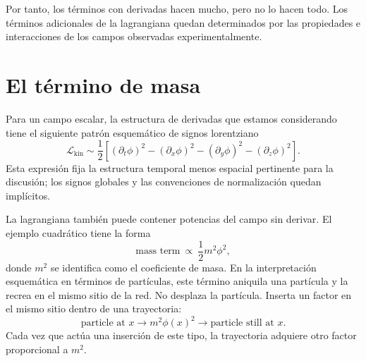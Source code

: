 \begin{classroomqa}\end{classroomqa}


Por tanto, los términos con derivadas hacen mucho, pero no lo hacen todo. Los términos adicionales de la lagrangiana quedan determinados por las propiedades e interacciones de los campos observadas experimentalmente.

\section{El término de masa}

Para un campo escalar, la estructura de derivadas que estamos considerando tiene el siguiente patrón esquemático de signos lorentziano
\begin{equation}
\mathcal{L}_{\mathrm{kin}}
\sim
\frac{1}{2}\left[
(\partial_t\phi)^2
-(\partial_x\phi)^2
-(\partial_y\phi)^2
-(\partial_z\phi)^2
\right].
\end{equation}
Esta expresión fija la estructura temporal menos espacial pertinente para la discusión; los signos globales y las convenciones de normalización quedan implícitos.

La lagrangiana también puede contener potencias del campo sin derivar. El ejemplo cuadrático tiene la forma
\begin{equation}
\text{mass term}\ \propto\ \frac{1}{2}m^2\phi^2,
\end{equation}
donde \(m^2\) se identifica como el coeficiente de masa. En la interpretación esquemática en términos de partículas, este término aniquila una partícula y la recrea en el mismo sitio de la red. No desplaza la partícula. Inserta un factor en el mismo sitio dentro de una trayectoria:
\begin{equation}
\text{particle at }x
\longrightarrow
\boxed{m^2\phi(x)^2}
\longrightarrow
\text{particle still at }x.
\end{equation}
Cada vez que actúa una inserción de este tipo, la trayectoria adquiere otro factor proporcional a \(m^2\).

